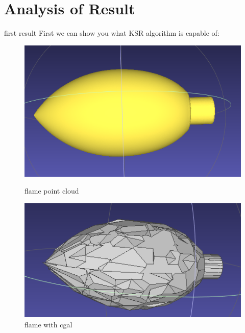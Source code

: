 \documentclass[10pt]{beamer}
\begin{document}
\section{Analysis of Result}
\begin{frame}{first result}
First we can show you what KSR algorithm is capable of: 
\begin{figure}[H]
    \begin{minipage}[t]{0.33\textwidth}
        \includegraphics[width=\textwidth]{../../images/screen_kinetic/flame_point.png}
        \caption*{flame point cloud}
    \end{minipage}
    \begin{minipage}[t]{0.33\textwidth}
      \includegraphics[width=\textwidth]{../../images/screen_kinetic/flame_cgal.png}
      \caption*{flame with cgal}
    \end{minipage}
    \begin{minipage}[t]{0.33\textwidth}

\end{minipage}
\end{figure}
\end{frame}
\end{document}
